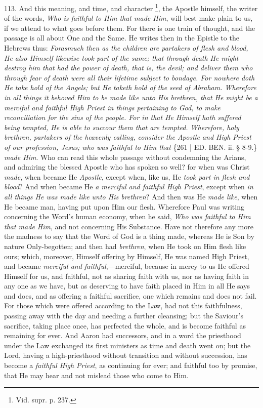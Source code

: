 113. And this meaning, and
time, and character \footnote{Vid. supr. p. 237.}, the
Apostle himself, the writer of the words, \emph{Who is faithful to Him
that made Him}, will best make plain to us, if we attend to what
goes before them. For there is one train of thought, and the passage
is all about One and the Same. He writes then in the Epistle to the
Hebrews thus: \emph{Forasmuch then as the children are partakers of flesh
and blood, He also Himself likewise took part of the same; that
through death He might destroy him that had the power of death, that
is, the devil; and deliver them who through fear of death were all
their lifetime subject to bondage. For nowhere doth He take hold of
the Angels; but He taketh hold of the seed of Abraham. Wherefore in
all things it behoved Him to be made like unto His brethren, that He
might be a merciful and faithful High Priest in things pertaining to
God, to make reconciliation for the sins of the people. For in that He
Himself hath suffered being tempted, He is able to succour them that
are tempted. Wherefore, holy brethren, partakers of the heavenly
calling, consider the Apostle and High Priest of our profession,
Jesus; who was faithful to Him that} \{261 | ED.
BEN. ii. § 8-9.\} \emph{made Him}. Who can read
this whole passage without condemning the Arians, and admiring the
blessed Apostle who has spoken so well? for when was Christ \emph{made},
when became He \emph{Apostle}, except when, like us, He \emph{took part
in flesh and blood}? And when became He \emph{a merciful and faithful
High Priest}, except when \emph{in all things He was made like unto
His brethren}? And then was He \emph{made like}, when He became
man, having put upon Him our flesh. Wherefore Paul was writing
concerning the Word's human economy, when he said, \emph{Who was faithful
to Him that made Him}, and not concerning His Substance. Have not
therefore any more the madness to say that the Word of God is a thing
made, whereas He is Son by nature Only-begotten; and then had \emph{brethren},
when He took on Him flesh like ours; which, moreover, Himself offering
by Himself, He was named High Priest, and became \emph{merciful and
faithful},—merciful, because in mercy to us He offered Himself
for us, and faithful, not as sharing faith with us, nor as having
faith in any one as we have, but as deserving to have faith placed in
Him in all He says and does, and as offering a faithful sacrifice, one
which remains and does not fail. For those which were offered
according to the Law, had not this faithfulness, passing away with the
day and needing a further cleansing; but the Saviour's sacrifice,
taking place once, has perfected the whole, and is become faithful as
remaining for ever. And Aaron had successors, and in a word the
priesthood under the Law exchanged its first ministers as time and
death went on; but the Lord, having a high-priesthood without
transition and without succession, has become a \emph{faithful High
Priest}, as continuing for ever; and faithful too by promise, that
He may hear and not mislead those who come to Him.

